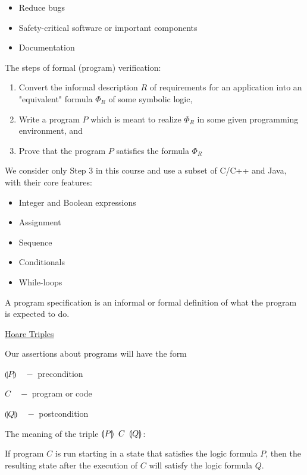 \documentclass{article}
\begin{document}
\begin{itemize}
    \item Reduce bugs
    \item Safety-critical software or important components
    \item Documentation 
\end{itemize}

The steps of formal (program) verification:
\begin{enumerate}
    \item Convert the informal description $R$ of requirements for an application into an "equivalent" formula $\Phi_{R}$ of some symbolic logic,
    \item Write a program $P$ which is meant to realize $\Phi_{R}$ in some given programming environment, and
    \item Prove that the program $P$ satisfies the formula $\Phi_{R}$
\end{enumerate}

We consider only Step 3 in this course and use a subset of C/C++ and Java, with their core features:
\begin{itemize}
    \item Integer and Boolean expressions
    \item Assignment
    \item Sequence
    \item Conditionals
    \item While-loops
\end{itemize}

A program specification is an informal or formal definition of what the program is expected to do.

\underline{Hoare Triples}

Our assertions about programs will have the form

$\llparenthesis P \rrparenthesis \quad -$ precondition

$C \quad - $ program or code

$\llparenthesis Q \rrparenthesis \quad -$ postcondition

The meaning of the triple $\llparenthesis P \rrparenthesis \hspace{0.5em} C \hspace{0.5em} \llparenthesis Q \rrparenthesis$:

If program $C$ is run starting in a state that satisfies the logic formula $P$, then the resulting state after the execution of $C$ will satisfy the logic formula $Q$.
\end{document}
